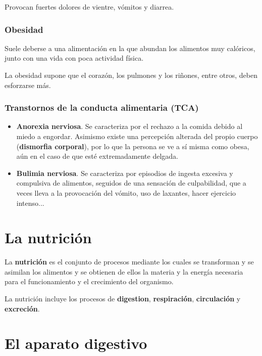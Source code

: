 \documentclass{article}
\begin{document}
				Provocan fuertes dolores de vientre, vómitos y diarrea.
				
			\subsubsection*{Obesidad}
				Suele deberse a una alimentación en la que abundan los alimentos muy calóricos, junto con una vida con poca actividad física.\par La obesidad supone que el corazón, los pulmones y los riñones, entre otros, deben esforzarse más. 
				  
			\subsubsection*{Transtornos de la conducta alimentaria (TCA)}
			
				\begin{itemize}
					\item \textbf{Anorexia nerviosa}. Se caracteriza por el rechazo a la comida debido al miedo a engordar. Asimismo existe una percepción alterada del propio cuerpo (\textbf{dismorfia corporal}), por lo que la persona se ve a sí misma como obesa, aún en el caso de que esté extremadamente delgada.
					\item \textbf{Bulimia nerviosa}. Se caracteriza por episodios de ingesta excesiva y compulsiva de alimentos, seguidos de una sensación de culpabilidad, que a veces lleva a la provocación del vómito, uso de laxantes, hacer ejercicio intenso...
				\end{itemize}
		
	\section{La nutrición}
	
	\begin{tcolorbox}
		La \textbf{nutrición} es el conjunto de procesos mediante los cuales se transforman y se asimilan los alimentos y se obtienen de ellos la materia y la energía necesaria para el funcionamiento y el crecimiento del organismo.

	\end{tcolorbox}
	
	La nutrición incluye los procesos de \textbf{digestion}, \textbf{respiración}, \textbf{circulación} y \textbf{excreción}.
	
	\section{El aparato digestivo}
		
\end{document}
